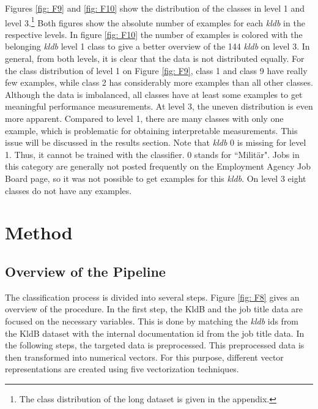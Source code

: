 \documentclass[12pt, a4paper, titlepage]{article}
\begin{document}
Figures \ref{fig: F9} and \ref{fig: F10} show the distribution of the classes in level 1 and level 3.\footnote{The class distribution of the long dataset is given in the appendix.} Both figures show the absolute number of examples for each \textit{kldb} in the respective levels. In figure \ref{fig: F10} the number of examples is colored with the belonging \textit{kldb} level 1 class to give a better overview of the 144 \textit{kldb} on level 3. In general, from both levels, it is clear that the data is not distributed equally. For the class distribution of level 1 on Figure \ref{fig: F9}, class 1 and class 9 have really few examples, while class 2 has considerably more examples than all other classes. Although the data is imbalanced, all classes have at least some examples to get meaningful performance measurements. At level 3, the uneven distribution is even more apparent. Compared to level 1, there are many classes with only one example, which is problematic for obtaining interpretable measurements. This issue will be discussed in the results section. Note that \textit{kldb} 0 is missing for level 1. Thus, it cannot be trained with the classifier. 0 stands for ``Militär". Jobs in this category are generally not posted frequently on the Employment Agency Job Board page, so it was not possible to get examples for this \textit{kldb}. On level 3 eight classes do not have any examples.


\section{Method}
\subsection{Overview of the Pipeline}
The classification process is divided into several steps. Figure \ref{fig: F8} gives an overview of the procedure. In the first step, the \ac{KldB} and the job title data are focused on the necessary variables. This is done by matching the \textit{kldb} ids from the \ac{KldB} dataset with the internal documentation id from the job title data. In the following steps, the targeted data is preprocessed. This preprocessed data is then transformed into numerical vectors. For this purpose, different vector representations are created using five vectorization techniques. 
\end{document}
